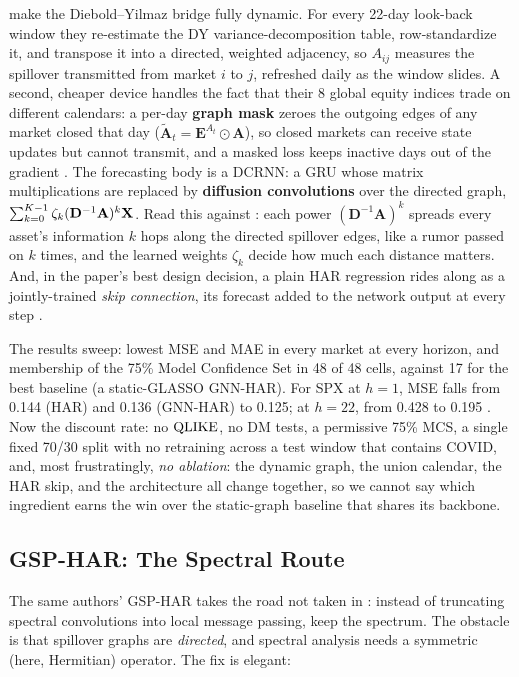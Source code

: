 \citet{ChiGaoWang2026DCRNN} make the Diebold--Yilmaz bridge fully dynamic. For every 22-day look-back window they re-estimate the DY variance-decomposition table, row-standardize it, and transpose it into a directed, weighted adjacency, so $A_{ij}$ measures the spillover transmitted from market $i$ to $j$, refreshed daily as the window slides. A second, cheaper device handles the fact that their 8 global equity indices trade on different calendars: a per-day \textbf{graph mask} zeroes the outgoing edges of any market closed that day ($\tilde{\mathbf{A}}_t = \mathbf{E}^{A_t} \odot \mathbf{A}$), so closed markets can receive state updates but cannot transmit, and a masked loss keeps inactive days out of the gradient \citep[\S3.2--3.3]{ChiGaoWang2026DCRNN}. The forecasting body is a DCRNN: a GRU whose matrix multiplications are replaced by \textbf{diffusion convolutions} over the directed graph, $\sum_{k=0}^{K-1} \zeta_k (\mathbf{D}^{-1}\mathbf{A})^k \mathbf{X}$. Read this against : each power $(\mathbf{D}^{-1}\mathbf{A})^k$ spreads every asset's information $k$ hops along the directed spillover edges, like a rumor passed on $k$ times, and the learned weights $\zeta_k$ decide how much each distance matters. And, in the paper's best design decision, a plain HAR regression rides along as a jointly-trained \emph{skip connection}, its forecast added to the network output at every step \citep[eq.~25]{ChiGaoWang2026DCRNN}.

The results sweep: lowest MSE and MAE in every market at every horizon, and membership of the 75\% Model Confidence Set in 48 of 48 cells, against 17 for the best baseline (a static-GLASSO GNN-HAR). For SPX at $h=1$, MSE falls from 0.144 (HAR) and 0.136 (GNN-HAR) to 0.125; at $h=22$, from 0.428 to 0.195 \citep[Tables~2--8]{ChiGaoWang2026DCRNN}. Now the discount rate: no $\operatorname{QLIKE}$, no DM tests, a permissive 75\% MCS, a single fixed 70/30 split with no retraining across a test window that contains COVID, and, most frustratingly, \emph{no ablation}: the dynamic graph, the union calendar, the HAR skip, and the architecture all change together, so we cannot say which ingredient earns the win over the static-graph baseline that shares its backbone.

\subsection{GSP-HAR: The Spectral Route}\label{sec:gnn:gsp}

The same authors' GSP-HAR \citep{ChiGaoWang2024GSP} takes the road not taken in : instead of truncating spectral convolutions into local message passing, keep the spectrum. The obstacle is that spillover graphs are \emph{directed}, and spectral analysis needs a symmetric (here, Hermitian) operator. The fix is elegant:

